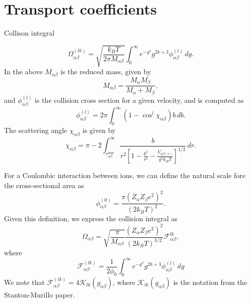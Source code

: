 \documentclass[oneside,a4paper,11pt]{report}
\begin{document}
\chapter{Transport coefficients}
Collison integral

\begin{equation}
    \Omega_{\alpha \beta}^{(lk)} = \sqrt{ \frac{k_B T}{2 \pi M_{\alpha \beta}} } \int_0^\infty e^{-g^2} g^{2k+3} \phi_{\alpha \beta}^{(l)} \, dg.
\end{equation}
In the above $M_{\alpha \beta}$ is the reduced mass, given by
\begin{equation}
    M_{\alpha \beta} = \frac{M_\alpha M_\beta}{M_\alpha + M_\beta},
\end{equation}
and $\phi^{(l)}_{\alpha \beta}$ is the collision cross section for a given velocity, and is computed as
\begin{equation}
    \phi_{\alpha \beta}^{(l)} = 2 \pi \int_0^\infty \left ( 1 - \cos^l \chi_{\alpha \beta} \right ) b \, db.
\end{equation}
The scattering angle $\chi_{\alpha \beta}$ is given by
\begin{equation}
    \chi_{\alpha \beta} = \pi - 2 \int_{r_{\alpha \beta}^{\text{min}}}^\infty \frac{b}{r^2 \left [ 1 - \frac{b^2}{r^2} - \frac{V_{\alpha \beta (r)}}{g^2 k_B T} \right ]^{1/2} } \, dr.
\end{equation}

For a Coulombic interaction between ions, we can define the natural scale fore the cross-sectional area as
\begin{equation}
    \phi^{(0)}_{\alpha \beta} = \frac{ \pi \left (Z_\alpha Z_\beta e^2 \right)^2}{ \left(2 k_B T\right)^2}.
\end{equation}
Given this definition, we express the collision integral as
\begin{equation}
    \Omega_{\alpha \beta} = \sqrt{ \frac{\pi }{M_{\alpha \beta}}} \frac{( Z_\alpha Z_\beta e^2)^2 }{(2 k_B T )^{3/2}} \mathcal{F}^{lk}_{\alpha \beta},
\end{equation}
where
\begin{equation}
    \mathcal{F}^{(lk)}_{\alpha \beta} = \frac{1}{2 \phi_0} \int_0^\infty e^{-g^2} g^{2k+3} \phi_{\alpha \beta}^{(l)} \, dg
\end{equation}
We note that $\mathcal{F}^{(lk)}_{\alpha \beta} = 4 \mathcal{K}_{lk}(g_{\alpha \beta})$, where $\mathcal{K}_{lk}(g_{\alpha \beta})$ is the notation from the Stanton-Murillo paper.
\end{document}
